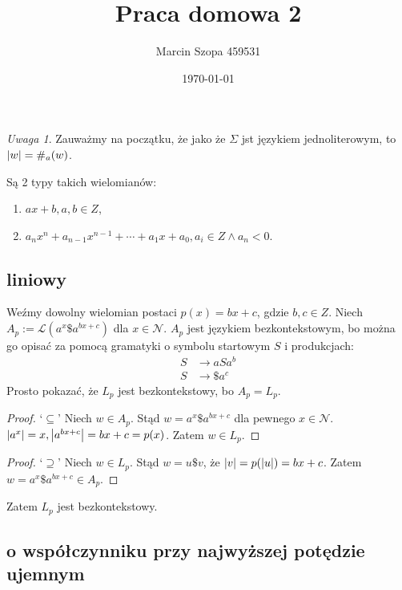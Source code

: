 \documentclass{article}
\title{Praca domowa 2}
\author{Marcin Szopa 459531}
\date{\today}
\theoremstyle{definition}
\theoremstyle{remark}
\newtheorem*{remark}{Uwaga}
\begin{document}
\maketitle

\section{}

\begin{remark}
    Zauważmy na początku, że jako że \(\Sigma\) jst językiem jednoliterowym, to
    \(\abs{w} = \#_a(w)\).
\end{remark}

Są 2 typy takich wielomianów:

\begin{enumerate}
    \item \(ax + b, a,b \in Z\),
    \item \(a_nx^n + a_{n-1}x^{n-1} + \cdots + a_1x + a_0, a_i \in Z \land a_n < 0\).
\end{enumerate}

\subsection{liniowy}

Weźmy dowolny wielomian postaci \( p(x)=bx + c\), gdzie \(b,c \in Z\). 
Niech \(A_p := \mathcal{L}(a^x \$ a^{bx + c})\) dla \(x \in \mathcal{N}\).
\(A_p\) jest językiem bezkontekstowym, bo można go opisać za pomocą gramatyki
o symbolu startowym \(S\) i produkcjach:
\begin{align*}
    S &\to a S a^b  \\
    S &\to \$ a^c
\end{align*}
Prosto pokazać, że \(L_p\) jest bezkontekstowy, bo \(A_p = L_p\).

\begin{proof}
    `\(\subseteq\)'
    Niech \(w \in A_p\). Stąd \(w = a^x \$ a^{bx + c}\) dla pewnego \(x \in \mathcal{N}\).
    \( \abs{a^x}=x, \abs{a^{bx + c}}=bx + c = p(x)\). Zatem \(w \in L_p\).
\end{proof}

\begin{proof}
    `\(\supseteq\)'
    Niech \(w \in L_p\). Stąd \(w = u \$ v\), że \( \abs{v} = p(\abs{u})
    = bx+c\). Zatem \(w = a^x \$ a^{bx + c} \in A_p\).
\end{proof}

Zatem \(L_p\) jest bezkontekstowy.

\subsection{o współczynniku przy najwyższej potędzie ujemnym}
\end{document}
